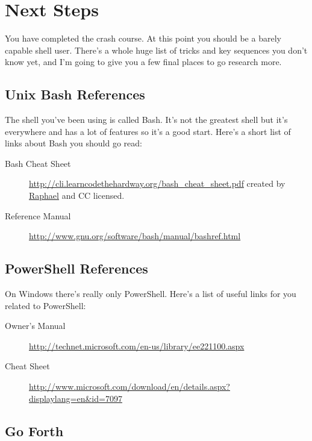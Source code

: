 \chapter{Next Steps}

You have completed the crash course.  At this point you should be a 
barely capable shell user.  There's a whole huge list of tricks and key
sequences you don't know yet, and I'm going to give you a few final
places to go research more.

\section{Unix Bash References}

The shell you've been using is called Bash.  It's not the greatest shell
but it's everywhere and has a lot of features so it's a good start.  Here's a 
short list of links about Bash you should go read:

\begin{description}
\item[Bash Cheat Sheet] \href{http://cli.learncodethehardway.org/bash_cheat_sheet.pdf}{http://cli.learncodethehardway.org/bash\_cheat\_sheet.pdf} created by \href{http://freeworld.posterous.com/65140847}{Raphael} and CC
licensed.
\item[Reference Manual] \href{http://www.gnu.org/software/bash/manual/bashref.html}{http://www.gnu.org/software/bash/manual/bashref.html}
\end{description}


\section{PowerShell References}

On Windows there's really only PowerShell.  Here's a list of useful links for you
related to PowerShell:

\begin{description}
\item[Owner's Manual] \href{http://technet.microsoft.com/en-us/library/ee221100.aspx}{http://technet.microsoft.com/en-us/library/ee221100.aspx}
\item[Cheat Sheet] \href{http://www.microsoft.com/download/en/details.aspx?displaylang=en&id=7097}{http://www.microsoft.com/download/en/details.aspx?displaylang=en\&id=7097}
\end{description}

\section{Go Forth}


